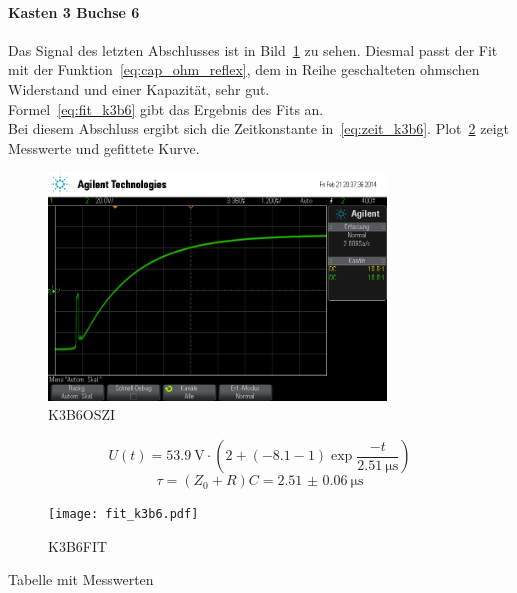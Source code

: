\paragraph{Kasten 3 Buchse 6}
Das Signal des letzten Abschlusses ist in Bild~\ref{fig:k3b6} zu 
sehen. 
Diesmal passt der Fit mit der 
Funktion~\eqref{eq:cap_ohm_reflex}, dem in Reihe geschalteten 
ohmschen Widerstand und einer Kapazität, sehr gut.\\
Formel~\eqref{eq:fit_k3b6} gibt das Ergebnis des Fits an.\\
Bei diesem Abschluss ergibt sich die Zeitkonstante 
in~\eqref{eq:zeit_k3b6}. 
Plot~\ref{fig:fit_k3b6} zeigt Messwerte und gefittete Kurve.\\
%
\begin{figure}[]
\centering
\includegraphics[width=0.8\textwidth]{k3b6.png}
\caption{K3B6OSZI}
\label{fig:k3b6}
\end{figure}
%
\begin{equation}
U(t) = \SI{53.9}{\volt}\cdot\left(2 + 
\left(-8.1 - 1\right)\exp{\frac{-t}{\SI{2.51}{\micro\second}}}\right)
\label{eq:fit_k3b6}
\end{equation}
%
\begin{equation}
\tau = (Z_0 + R)C = \SI{2.51(6)}{\micro\second}
\label{eq:zeit_k3b6}
\end{equation}
%
\begin{figure}[]
\centering
\texttt{[image: fit\_k3b6.pdf]}
\caption{K3B6FIT}
\label{fig:fit_k3b6}
\end{figure}
%
\FloatBarrier
%
Tabelle mit Messwerten
%
